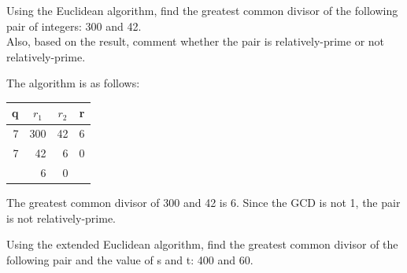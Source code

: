 \documentclass[a4paper]{exam}
\begin{document}
\begin{questions}
        \question[10]
        Using the Euclidean algorithm, find the greatest common divisor of the following pair of integers: 300 and 42.\\
        Also, based on the result, comment whether the pair is relatively-prime or not relatively-prime.
        \begin{solution}
            The algorithm is as follows:
            \begin{table}[H]
                \begin{center}
                    \begin{tabular}{|r|r|r|r|}
                        \hline
                        \multicolumn{1}{|c|}{\textbf{q}}                                      & \multicolumn{1}{c|}{\textbf{$r_1$}} & \multicolumn{1}{c|}{\textbf{$r_2$}} & \multicolumn{1}{c|}{\textbf{r}}                                      \\ \hline
                        7                                                                     & 300                                 & 42                                  & 6                                                                    \\ \hline
                        7                                                                     & 42                                  & 6                                   & 0                                                                    \\ \hline
                         & 6                                   & 0                                   &   \\ \hline
                    \end{tabular}
                \end{center}
            \end{table}
            The greatest common divisor of 300 and 42 is 6. Since the GCD is not 1, the pair is not relatively-prime.
        \end{solution}

        \pagebreak

        \question[10]
        Using the extended Euclidean algorithm, find the greatest common divisor of the following pair and the value of s and t: 400 and 60.


\end{questions}
\end{document}

